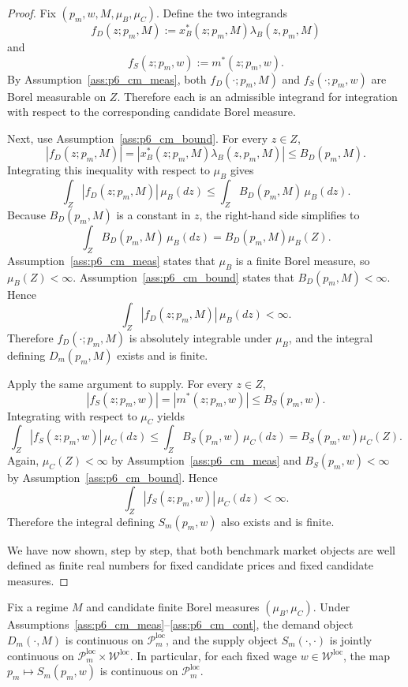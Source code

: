 \begin{proof}
Fix $(p_m,w,M,\mu_B,\mu_C)$. Define the two integrands
\[
f_D(z;p_m,M):=x_B^*(z;p_m,M)\lambda_B(z,p_m,M)
\]
and
\[
f_S(z;p_m,w):=m^*(z;p_m,w).
\]
By Assumption~\ref{ass:p6_cm_meas}, both $f_D(\cdot;p_m,M)$ and $f_S(\cdot;p_m,w)$ are Borel measurable on $Z$. Therefore each is an admissible integrand for integration with respect to the corresponding candidate Borel measure.

Next, use Assumption~\ref{ass:p6_cm_bound}. For every $z\in Z$,
\[
|f_D(z;p_m,M)|=\left|x_B^*(z;p_m,M)\lambda_B(z,p_m,M)\right|\le B_D(p_m,M).
\]
Integrating this inequality with respect to $\mu_B$ gives
\[
\int_Z |f_D(z;p_m,M)|\,\mu_B(dz)
\le
\int_Z B_D(p_m,M)\,\mu_B(dz).
\]
Because $B_D(p_m,M)$ is a constant in $z$, the right-hand side simplifies to
\[
\int_Z B_D(p_m,M)\,\mu_B(dz)
=
B_D(p_m,M)\mu_B(Z).
\]
Assumption~\ref{ass:p6_cm_meas} states that $\mu_B$ is a finite Borel measure, so $\mu_B(Z)<\infty$. Assumption~\ref{ass:p6_cm_bound} states that $B_D(p_m,M)<\infty$. Hence
\[
\int_Z |f_D(z;p_m,M)|\,\mu_B(dz)<\infty.
\]
Therefore $f_D(\cdot;p_m,M)$ is absolutely integrable under $\mu_B$, and the integral defining $D_m(p_m,M)$ exists and is finite.

Apply the same argument to supply. For every $z\in Z$,
\[
|f_S(z;p_m,w)|=|m^*(z;p_m,w)|\le B_S(p_m,w).
\]
Integrating with respect to $\mu_C$ yields
\[
\int_Z |f_S(z;p_m,w)|\,\mu_C(dz)
\le
\int_Z B_S(p_m,w)\,\mu_C(dz)
=
B_S(p_m,w)\mu_C(Z).
\]
Again, $\mu_C(Z)<\infty$ by Assumption~\ref{ass:p6_cm_meas} and $B_S(p_m,w)<\infty$ by Assumption~\ref{ass:p6_cm_bound}. Hence
\[
\int_Z |f_S(z;p_m,w)|\,\mu_C(dz)<\infty.
\]
Therefore the integral defining $S_m(p_m,w)$ also exists and is finite.

We have now shown, step by step, that both benchmark market objects are well defined as finite real numbers for fixed candidate prices and fixed candidate measures.
\end{proof}

\begin{proposition}
Fix a regime $M$ and candidate finite Borel measures $(\mu_B,\mu_C)$. Under Assumptions~\ref{ass:p6_cm_meas}--\ref{ass:p6_cm_cont}, the demand object $D_m(\cdot,M)$ is continuous on $\mathcal P_m^{\mathrm{loc}}$, and the supply object $S_m(\cdot,\cdot)$ is jointly continuous on $\mathcal P_m^{\mathrm{loc}}\times \mathcal W^{\mathrm{loc}}$. In particular, for each fixed wage $w\in\mathcal W^{\mathrm{loc}}$, the map $p_m\mapsto S_m(p_m,w)$ is continuous on $\mathcal P_m^{\mathrm{loc}}$.
\end{proposition}

